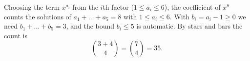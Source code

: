 Choosing the term $x^{a_i}$ from the $i$th factor ($1\le a_i\le6$), the coefficient of $x^8$ counts the solutions of $a_1+\dots+a_5=8$ with $1\le a_i\le6$. With $b_i=a_i-1\ge0$ we need $b_1+\dots+b_5=3$, and the bound $b_i\le5$ is automatic. By stars and bars the count is
\[\binom{3+4}{4}=\binom74=\boxed{35}.\]
